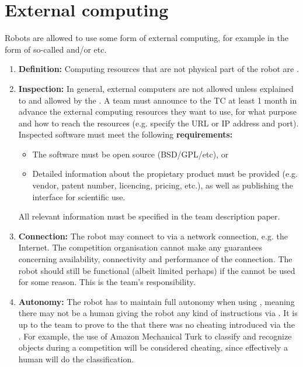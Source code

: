 \section{External computing}\label{rule:robot_external_computing}
Robots are allowed to use some form of external computing, for example in the form of so-called  and/or  etc. 
\begin{enumerate}
	\item \textbf{Definition:} Computing resources that are not physical part of the robot are . 
	\item \textbf{Inspection:} In general, external computers are not allowed unless explained to and allowed by the .
	  A team must announce to the TC at least 1 month in advance the external computing resources they want to use, for what purpose and how to reach the resources (e.g. specify the URL or IP address and port). Inspected software must meet the following \textbf{requirements:}
	  \begin{itemize}
	  	\item The software must be open source (BSD/GPL/etc), or
        \item Detailed information about the propietary product must be provided (e.g. vendor, patent number, licencing, pricing, etc.), as well as publishing the interface for scientific use.
	  \end{itemize}
	All relevant information must be specified in the team description paper.
	\item \textbf{Connection:} The robot may connect to  via a network connection, e.g. the Internet. 
	  The competition organisation cannot make any guarantees concerning availability, connectivity and performance of the connection. 
	  The robot should still be functional (albeit limited perhaps) if the  cannot be used for some reason.
	  This is the team's responsibility. 
	\item \textbf{Autonomy:} The robot has to maintain full autonomy when using , 
	  meaning there may not be a human giving the robot any kind of instructions via .
	  It is up to the team to prove to the  that there was no cheating introduced via the . 
	  For example, the use of Amazon Mechanical Turk to classify and recognize objects during a competition will be considered cheating, since effectively a human will do the classification.

\end{enumerate}
